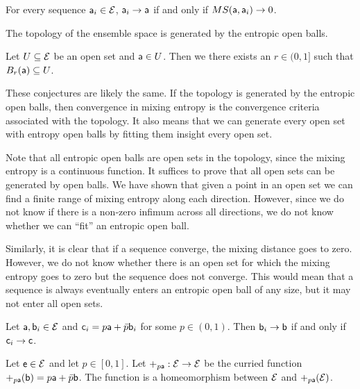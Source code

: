 \begin{conj}
	For every sequence $\ens[a]_i \in \Ens$, $\ens[a]_i \to \ens[a]$ if and only if $MS(\ens[a], \ens[a]_i) \to 0$.
\end{conj}

\begin{conj}
	The topology of the ensemble space is generated by the entropic open balls.
\end{conj}

\begin{conj}
	Let $U \subseteq \Ens$ be an open set and $\ens[a] \in U$. Then we there exists an $r \in (0,1]$ such that $B_r(\ens[a]) \subseteq U$.
\end{conj}

\begin{remark}
	These conjectures are likely the same. If the topology is generated by the entropic open balls, then convergence in mixing entropy is the convergence criteria associated with the topology. It also means that we can generate every open set with entropy open balls by fitting them insight every open set.
	
	Note that all entropic open balls are open sets in the topology, since the mixing entropy is a continuous function. It suffices to prove that all open sets can be generated by open balls. We have shown that given a point in an open set we can find a finite range of mixing entropy along each direction. However, since we do not know if there is a non-zero infimum across all directions, we do not know whether we can ``fit'' an entropic open ball.
	
	Similarly, it is clear that if a sequence converge, the mixing distance goes to zero. However, we do not know whether there is an open set for which the mixing entropy goes to zero but the sequence does not converge. This would mean that a sequence is always eventually enters an entropic open ball of any size, but it may not enter all open sets.
\end{remark}

\begin{conj}
	Let $\ens[a], \ens[b]_i\in \Ens$ and $\ens[c]_i = p \ens[a] +\bar{p} \ens[b]_i$ for some $p \in (0,1)$. Then $\ens[b]_i \to \ens[b]$ if and only if $\ens[c]_i \to \ens[c]$. 
\end{conj}

\begin{conj}
	Let $\ens \in \Ens$ and let $p \in [0,1]$. Let $+_{p\ens[a]} : \Ens \to \Ens$ be the curried function $+_{p\ens[a]}(\ens[b]) = p\ens[a] + \bar{p}\ens[b]$. The function is a homeomorphism between $\Ens$ and $+_{p\ens[a]}(\Ens)$.
\end{conj}

